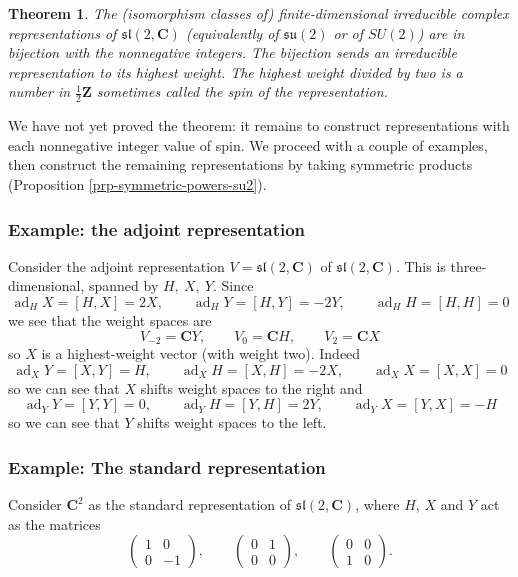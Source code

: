 \documentclass[12pt]{article}
\newcommand{\CC}{\mathbf{C}}
\newcommand{\ZZ}{\mathbf{Z}}
\newcommand{\OP}{\operatorname}
\newtheorem{thm}{Theorem}[section]
\theoremstyle{definition}
\theoremstyle{check}
\theoremstyle{remark}
\theoremstyle{TheoremNum}
\begin{document}
\begin{thm}
The (isomorphism classes of) finite-dimensional irreducible complex representations of $\mathfrak{sl}(2,\CC)$ (equivalently of $\mathfrak{su}(2)$ or of $SU(2)$) are in bijection with the nonnegative integers. The bijection sends an irreducible representation to its highest weight. The highest weight divided by two is a number in $\tfrac{1}{2}\ZZ$ sometimes called the {\em spin} of the representation.
\end{thm}

We have not yet proved the theorem: it remains to construct representations with each nonnegative integer value of spin. We proceed with a couple of examples, then construct the remaining representations by taking symmetric products (Proposition \ref{prp-symmetric-powers-su2}).

\subsubsection{Example: the adjoint representation}

Consider the adjoint representation $V=\mathfrak{sl}(2,\CC)$ of $\mathfrak{sl}(2,\CC)$. This is three-dimensional, spanned by $H,\ X,\ Y$. Since
\[\OP{ad}_HX=[H,X]=2X,\qquad\OP{ad}_HY=[H,Y]=-2Y,\qquad\OP{ad}_HH=[H,H]=0\]
we see that the weight spaces are
\[V_{-2}=\CC Y,\qquad V_0=\CC H,\qquad V_2=\CC X\]
so $X$ is a highest-weight vector (with weight two). Indeed
\[\OP{ad}_XY=[X,Y]=H,\qquad\OP{ad}_XH=[X,H]=-2X,\qquad\OP{ad}_XX=[X,X]=0\]
so we can see that $X$ shifts weight spaces to the right and
\[\OP{ad}_YY=[Y,Y]=0,\qquad\OP{ad}_YH=[Y,H]=2Y,\qquad\OP{ad}_YX=[Y,X]=-H\]
so we can see that $Y$ shifts weight spaces to the left.


\subsubsection{Example: The standard representation}

Consider $\CC^2$ as the standard representation of $\mathfrak{sl}(2,\CC)$, where $H$, $X$ and $Y$ act as the matrices
\[\left(\begin{array}{cc}1 & 0 \\0 & -1\end{array}\right),\qquad\left(\begin{array}{cc}0 & 1 \\0 & 0\end{array}\right),\qquad\left(\begin{array}{cc}0 & 0 \\1 & 0\end{array}\right).\]
\end{document}
